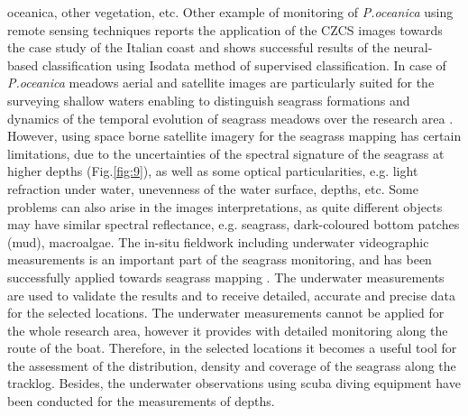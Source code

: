 \documentclass[10pt, a4paper]{article}
\begin{document}
oceanica, other vegetation, etc.
Other example of monitoring of \textit{P.oceanica} using remote sensing techniques \cite{Calvo03}\label{Calvo03}
reports the application of the CZCS images towards the case study of the Italian coast and shows
successful results of the neural-based classification using Isodata method of supervised classification.
In case of \textit{P.oceanica} meadows aerial and satellite images are particularly suited for the surveying
shallow waters \cite{Pasqualini98b}\label{Pasqualini98b} enabling to distinguish seagrass formations and dynamics of
the temporal evolution of seagrass meadows over the research area \cite{Pasqualini01}\label{Pasqualini01}.
However, using space borne satellite imagery for the seagrass mapping has certain limitations, due to
the uncertainties of the spectral signature of the seagrass at higher depths  (Fig.\ref{fig:9}), as well as some
optical particularities, e.g. light refraction under water, unevenness of the water surface, depths, etc.
Some problems can also arise in the images interpretations, as quite different objects may have
similar spectral reflectance, e.g. seagrass, dark-coloured bottom patches (mud), macroalgae.
The in-situ fieldwork including underwater videographic measurements is an important part of the
seagrass monitoring, and has been successfully applied towards seagrass mapping \cite{Haag08}\label{Haag08}.
The underwater measurements are used to validate the results and to receive detailed, accurate and
precise data for the selected locations. The underwater measurements cannot be applied for the whole
research area, however it provides with detailed monitoring along the route of the boat. Therefore, in
the selected locations it becomes a useful tool for the assessment of the distribution, density and
coverage of the seagrass along the tracklog. Besides, the underwater observations using scuba diving
equipment have been conducted for the measurements of depths.
\end{document}
